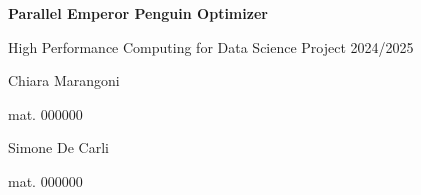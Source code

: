 \begin{center}
    \centering  %
    {\Huge\textbf{Parallel Emperor Penguin Optimizer}\par} %
    \vspace{0.5cm}
    {\Large High Performance Computing for Data Science Project 2024/2025 \par} %
    \vspace{1cm}

    \noindent
    \begin{minipage}[t]{0.5\textwidth} %
        \centering
        {\large Chiara Marangoni \par}
        {\small mat. 000000 \par} %
    \end{minipage}%
    \hfill %
    \begin{minipage}[t]{0.5\textwidth} %
        \centering
        {\large Simone De Carli \par}
        {\small mat. 000000 \par} %
    \end{minipage}
    \vspace{1,5cm}
\end{center}